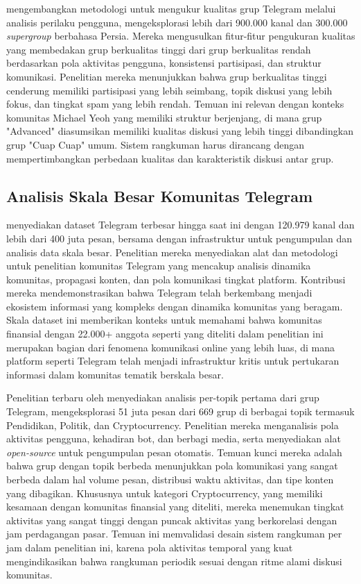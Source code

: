 \textcite{hashemi2019} mengembangkan metodologi untuk mengukur kualitas grup Telegram melalui analisis perilaku pengguna, mengeksplorasi lebih dari 900.000 kanal dan 300.000 \textit{supergroup} berbahasa Persia. Mereka mengusulkan fitur-fitur pengukuran kualitas yang membedakan grup berkualitas tinggi dari grup berkualitas rendah berdasarkan pola aktivitas pengguna, konsistensi partisipasi, dan struktur komunikasi. Penelitian mereka menunjukkan bahwa grup berkualitas tinggi cenderung memiliki partisipasi yang lebih seimbang, topik diskusi yang lebih fokus, dan tingkat spam yang lebih rendah. Temuan ini relevan dengan konteks komunitas Michael Yeoh yang memiliki struktur berjenjang, di mana grup "Advanced" diasumsikan memiliki kualitas diskusi yang lebih tinggi dibandingkan grup "Cuap Cuap" umum. Sistem rangkuman harus dirancang dengan mempertimbangkan perbedaan kualitas dan karakteristik diskusi antar grup.

\subsection{Analisis Skala Besar Komunitas Telegram}

\textcite{lamorgia2024} menyediakan dataset Telegram terbesar hingga saat ini dengan 120.979 kanal dan lebih dari 400 juta pesan, bersama dengan infrastruktur untuk pengumpulan dan analisis data skala besar. Penelitian mereka menyediakan alat dan metodologi untuk penelitian komunitas Telegram yang mencakup analisis dinamika komunitas, propagasi konten, dan pola komunikasi tingkat platform. Kontribusi mereka mendemonstrasikan bahwa Telegram telah berkembang menjadi ekosistem informasi yang kompleks dengan dinamika komunitas yang beragam. Skala dataset ini memberikan konteks untuk memahami bahwa komunitas finansial dengan 22.000+ anggota seperti yang diteliti dalam penelitian ini merupakan bagian dari fenomena komunikasi online yang lebih luas, di mana platform seperti Telegram telah menjadi infrastruktur kritis untuk pertukaran informasi dalam komunitas tematik berskala besar.

Penelitian terbaru oleh \textcite{perlo2025} menyediakan analisis per-topik pertama dari grup Telegram, mengeksplorasi 51 juta pesan dari 669 grup di berbagai topik termasuk Pendidikan, Politik, dan Cryptocurrency. Penelitian mereka menganalisis pola aktivitas pengguna, kehadiran bot, dan berbagi media, serta menyediakan alat \textit{open-source} untuk pengumpulan pesan otomatis. Temuan kunci mereka adalah bahwa grup dengan topik berbeda menunjukkan pola komunikasi yang sangat berbeda dalam hal volume pesan, distribusi waktu aktivitas, dan tipe konten yang dibagikan. Khususnya untuk kategori Cryptocurrency, yang memiliki kesamaan dengan komunitas finansial yang diteliti, mereka menemukan tingkat aktivitas yang sangat tinggi dengan puncak aktivitas yang berkorelasi dengan jam perdagangan pasar. Temuan ini memvalidasi desain sistem rangkuman per jam dalam penelitian ini, karena pola aktivitas temporal yang kuat mengindikasikan bahwa rangkuman periodik sesuai dengan ritme alami diskusi komunitas.


